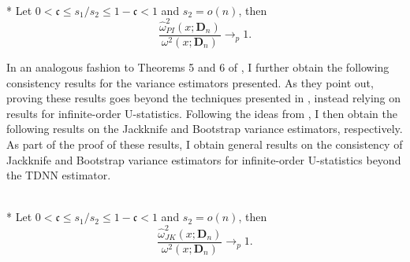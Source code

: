\begin{boxD}
	\begin{thm}\label{thm:PI_JK_Cons}\mbox{}\\*
		Let $0 < \mathfrak{c} \leq s_1/s_2 \leq 1 - \mathfrak{c} < 1$ and $s_2 = o(n)$, then
		\begin{equation}
			\frac{\hat{\omega}_{PI}^2\left(x; \mathbf{D}_n\right)}{\omega^{2}\left(x; \mathbf{D}_n\right)} \longrightarrow_{p} 1.
		\end{equation}
	\end{thm}
\end{boxD}


In an analogous fashion to Theorems 5 and 6 of \citet{demirkaya_optimal_2024}, I further obtain the following consistency results for the variance estimators presented.
As they point out, proving these results goes beyond the techniques presented in \citet{arvesen_jackknifing_1969}, instead relying on results for infinite-order U-statistics.
Following the ideas from \citet{peng_bias_2021}, I then obtain the following results on the Jackknife and Bootstrap variance estimators, respectively.
As part of the proof of these results, I obtain general results on the consistency of Jackknife and Bootstrap variance estimators for infinite-order U-statistics beyond the TDNN estimator.
\begin{boxD}
	\begin{thm}\label{thm:JK_Cons}\mbox{}\\*
		Let $0 < \mathfrak{c} \leq s_1/s_2 \leq 1 - \mathfrak{c} < 1$ and $s_2 = o(n)$, then
		\begin{equation}
			\frac{\hat{\omega}_{JK}^2\left(x; \mathbf{D}_n\right)}{\omega^{2}\left(x; \mathbf{D}_n\right)} \longrightarrow_{p} 1.
		\end{equation}
	\end{thm}
\end{boxD}

